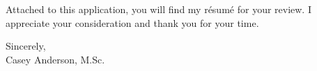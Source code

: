 \begin{center}
\begin{minipage}{\textwidth}
\begin{itemize}[leftmargin=.45in,rightmargin=.45in,itemsep=1.6mm]
  \end{itemize} 

  \vspace{3mm}

  Attached to this application, you will find my r\'{e}sum\'{e} for your review. 
  I appreciate your consideration and thank you for your time.

  
  \vspace{6mm}
  
  Sincerely, \\ 
  
  
  Casey Anderson, M.Sc.
  
  \end{minipage}
\end{center}


